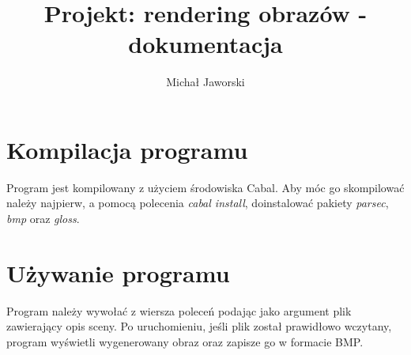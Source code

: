 \documentclass[11pt,a4paper]{article}
\title{\vspace{-2.0cm}\textbf{Projekt: rendering obrazów - dokumentacja}}
\author{Michał Jaworski}
\begin{document}
\maketitle
\section{Kompilacja programu}
Program jest kompilowany z użyciem środowiska Cabal. Aby móc go skompilować należy najpierw, a pomocą polecenia \textit{cabal install}, doinstalować pakiety \textit{parsec}, \textit{bmp} oraz \textit{gloss}.
\section{Używanie programu}
Program należy wywołać z wiersza poleceń podając jako argument plik zawierający opis sceny. Po uruchomieniu, jeśli plik został prawidłowo wczytany, program wyświetli wygenerowany obraz oraz zapisze go w formacie BMP.
\end{document}
